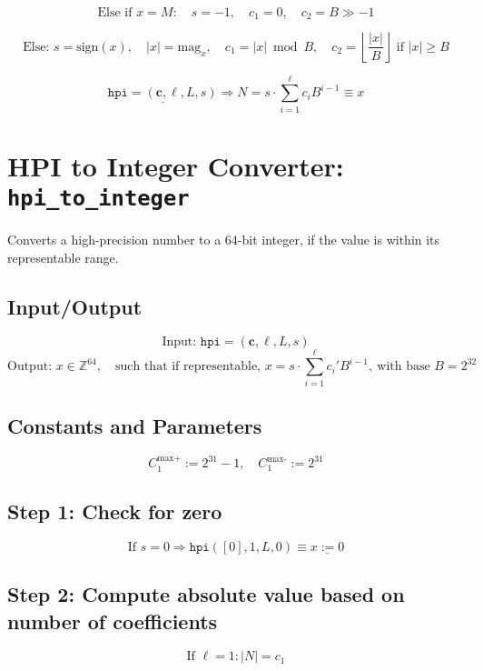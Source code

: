 \documentclass[11pt]{article}
\begin{document}
	\[
	\text{Else if } x = M: \quad s = -1, \quad c_1 = 0, \quad c_2 = B \gg -1
	\]
	
	
	\[
	\text{Else: } s = \text{sign}(x), \quad |x| = \text{mag}_x,
	\quad c_1 = |x| \bmod B,
	\quad c_2 = \left\lfloor \frac{|x|}{B} \right\rfloor \text{ if } |x| \ge B
	\]
	
	
	\[
	\underline{\texttt{hpi} = (\mathbf{c}, \ell, L, s)} \Rightarrow N = s \cdot \sum_{i=1}^\ell c_i B^{i-1} \equiv x
	\]
	

	\newpage
	

	\section{HPI to Integer Converter: \texttt{hpi\_to\_integer}}
	
	Converts a high-precision number to a 64-bit integer, if the value is within its representable range.
	
	\subsection*{Input/Output}
	\[
	\text{Input: } \texttt{hpi} = (\mathbf{c}, \ell, L, s)
	\]
	\[
	\text{Output: } x \in \mathbb{Z}^{64}, \quad \text{such that if representable, } x = s \cdot \sum_{i=1}^{\ell} c_i' B^{i-1},\ \text{with base } B = 2^{32}
	\]
	
	
	\subsection*{Constants and Parameters}
	\[
	 C_1^{\text{max+}} := 2^{31} - 1, \quad C_1^{\text{max-}} := 2^{31}
	\]
	
	
	\subsection*{Step 1: Check for zero}
	\[
	\text{If } s = 0 \Rightarrow   \texttt{hpi}([0], 1, L, 0) \equiv \underline{x := 0} 
	\]
	
	
	\subsection*{Step 2: Compute absolute value based on number of coefficients}
	\[
	\text{If } \ell = 1 : |N| = c_1
	\]
	
	
\end{document}
